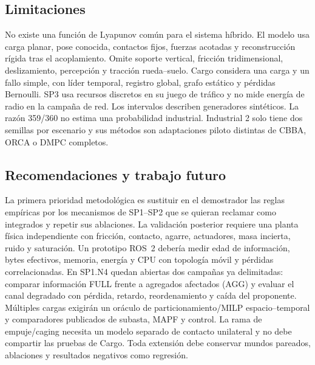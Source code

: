 \subsection{Limitaciones}

No existe una función de Lyapunov común para el sistema híbrido. El modelo usa carga planar, pose conocida, contactos fijos, fuerzas acotadas y reconstrucción rígida tras el acoplamiento. Omite soporte vertical, fricción tridimensional, deslizamiento, percepción y tracción rueda--suelo. Cargo considera una carga y un fallo simple, con líder temporal, registro global, grafo estático y pérdidas Bernoulli. SP3 usa recursos discretos en su juego de tráfico y no mide energía de radio en la campaña de red. Los intervalos describen generadores sintéticos. La razón 359/360 no estima una probabilidad industrial. Industrial 2 solo tiene dos semillas por escenario y sus métodos son adaptaciones piloto distintas de CBBA, ORCA o DMPC completos.

\subsection{Recomendaciones y trabajo futuro}

La primera prioridad metodológica es sustituir en el demostrador las reglas
empíricas por los mecanismos de SP1--SP2 que se quieran reclamar como integrados
y repetir sus ablaciones. La validación posterior requiere una planta física
independiente con fricción, contacto, agarre, actuadores, masa incierta, ruido y
saturación. Un prototipo ROS~2 debería medir edad de información, bytes
efectivos, memoria, energía y CPU con topología móvil y pérdidas correlacionadas.
En SP1.N4 quedan abiertas dos campañas ya delimitadas: comparar información
FULL frente a agregados afectados (AGG) y evaluar el canal degradado con pérdida,
retardo, reordenamiento y caída del proponente.
Múltiples cargas exigirán un oráculo de particionamiento/MILP espacio--temporal
y comparadores publicados de subasta, MAPF y control. La rama de empuje/caging
necesita un modelo separado de contacto unilateral y no debe compartir las
pruebas de Cargo. Toda extensión debe conservar mundos pareados, ablaciones y
resultados negativos como regresión.
